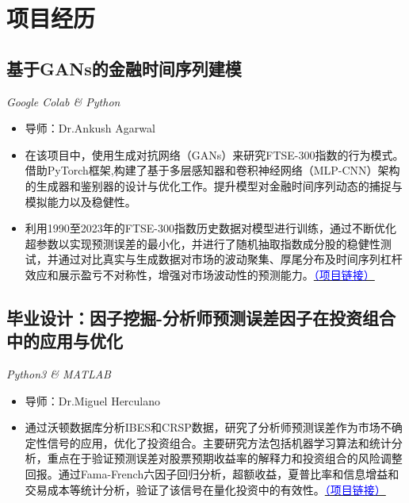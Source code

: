 \documentclass{resume}
\begin{document}
\hypersetup{
    colorlinks=true, %
    urlcolor=blue %
}
\section{项目经历}
\subsection{\textbf{基于GANs的金融时间序列建模}}
{\textit{Google Colab \& Python}}
\begin{itemize}[itemsep=0.1ex, parsep=0.1ex]
    \item 导师：Dr.Ankush Agarwal
    \item 在该项目中，使用生成对抗网络（GANs）来研究FTSE-300指数的行为模式。借助PyTorch框架,构建了基于多层感知器和卷积神经网络（MLP-CNN）架构的生成器和鉴别器的设计与优化工作。提升模型对金融时间序列动态的捕捉与模拟能力以及稳健性。
    \item 利用1990至2023年的FTSE-300指数历史数据对模型进行训练，通过不断优化超参数以实现预测误差的最小化，并进行了随机抽取指数成分股的稳健性测试，并通过对比真实与生成数据对市场的波动聚集、厚尾分布及时间序列杠杆效应和展示盈亏不对称性，增强对市场波动性的预测能力。\href{https://github.com/LeiWangUog/Modeling-financial-time-series-GAN}{\textcolor{blue}{（项目链接）}}
\end{itemize}

\subsection{\textbf{毕业设计：因子挖掘-分析师预测误差因子在投资组合中的应用与优化}}
{\textit{Python3 \& MATLAB}}
\begin{itemize}[itemsep=0.1ex, parsep=0.1ex]
  \item 导师：Dr.Miguel Herculano
  \item 通过沃顿数据库分析IBES和CRSP数据，研究了分析师预测误差作为市场不确定性信号的应用，优化了投资组合。主要研究方法包括机器学习算法和统计分析，重点在于验证预测误差对股票预期收益率的解释力和投资组合的风险调整回报。通过Fama-French六因子回归分析，超额收益，夏普比率和信息增益和交易成本等统计分析，验证了该信号在量化投资中的有效性。\href{  https://github.com/LeiWangUog/WRDS_Singal_FE_UOG}{\textcolor{blue}{（项目链接）}}
\end{itemize}
\end{document}
